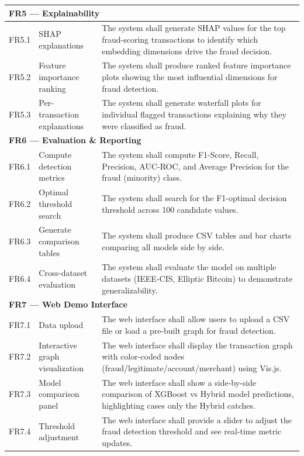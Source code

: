 \begin{table}[h!]
\begin{tabular}{|c|p{4cm}|p{8cm}|}
\multicolumn{3}{|l|}{\textbf{FR5 — Explainability}} \\
\hline
FR5.1 & SHAP explanations & The system shall generate SHAP values for the top fraud-scoring transactions to identify which embedding dimensions drive the fraud decision. \\
\hline
FR5.2 & Feature importance ranking & The system shall produce ranked feature importance plots showing the most influential dimensions for fraud detection. \\
\hline
FR5.3 & Per-transaction explanations & The system shall generate waterfall plots for individual flagged transactions explaining why they were classified as fraud. \\
\hline

\multicolumn{3}{|l|}{\textbf{FR6 — Evaluation \& Reporting}} \\
\hline
FR6.1 & Compute detection metrics & The system shall compute F1-Score, Recall, Precision, AUC-ROC, and Average Precision for the fraud (minority) class. \\
\hline
FR6.2 & Optimal threshold search & The system shall search for the F1-optimal decision threshold across 100 candidate values. \\
\hline
FR6.3 & Generate comparison tables & The system shall produce CSV tables and bar charts comparing all models side by side. \\
\hline
FR6.4 & Cross-dataset evaluation & The system shall evaluate the model on multiple datasets (IEEE-CIS, Elliptic Bitcoin) to demonstrate generalizability. \\
\hline

\multicolumn{3}{|l|}{\textbf{FR7 — Web Demo Interface}} \\
\hline
FR7.1 & Data upload & The web interface shall allow users to upload a CSV file or load a pre-built graph for fraud detection. \\
\hline
FR7.2 & Interactive graph visualization & The web interface shall display the transaction graph with color-coded nodes (fraud/legitimate/account/merchant) using Vis.js. \\
\hline
FR7.3 & Model comparison panel & The web interface shall show a side-by-side comparison of XGBoost vs Hybrid model predictions, highlighting cases only the Hybrid catches. \\
\hline
FR7.4 & Threshold adjustment & The web interface shall provide a slider to adjust the fraud detection threshold and see real-time metric updates. \\
\hline

\end{tabular}
\end{table}

